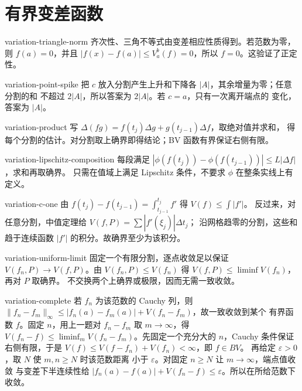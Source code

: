\chapter{有界变差函数}
\begin{solution}{variation-triangle-norm}
齐次性、三角不等式由变差相应性质得到。若范数为零，则 \(f(a)=0\)，并且
\(|f(x)-f(a)|\le V_a^b(f)=0\)，所以 \(f=0\)。这验证了正定性。
\end{solution}
\begin{solution}{variation-point-spike}
把 \(c\) 放入分割产生上升和下降各 \(|A|\)，其余增量为零；任意分割的和
不超过 \(2|A|\)，所以答案为 \(2|A|\)。若 \(c=a\)，只有一次离开端点的
变化，答案为 \(|A|\)。
\end{solution}
\begin{solution}{variation-product}
写 \(\Delta(fg)=f(t_j)\Delta g+g(t_{j-1})\Delta f\)，取绝对值并求和，
得每个分割的估计。对分割取上确界即得结论；BV 函数有界保证右侧有限。
\end{solution}
\begin{solution}{variation-lipschitz-composition}
每段满足 \(|\phi(f(t_j))-\phi(f(t_{j-1}))|\le L|\Delta f|\)，求和再取确界。
只需在值域上满足 Lipschitz 条件，不要求 \(\phi\) 在整条实线上有定义。
\end{solution}
\begin{solution}{variation-c-one}
由 \(f(t_j)-f(t_{j-1})=\int_{t_{j-1}}^{t_j}f'\) 得 \(V(f)\le\int|f'|\)。
反过来，对任意分割，中值定理给 \(V(f,P)=\sum|f'(\xi_j)|\Delta t_j\)；
沿网格趋零的分割，这些和趋于连续函数 \(|f'|\) 的积分。故确界至少为该积分。
\end{solution}
\begin{solution}{variation-uniform-limit}
固定一个有限分割，逐点收敛足以保证 \(V(f_n,P)\to V(f,P)\)。由
\(V(f_n,P)\le V(f_n)\) 得 \(V(f,P)\le\liminf V(f_n)\)，再对 \(P\) 取确界。
不交换两个上确界或极限，因而无需一致收敛。
\end{solution}
\begin{solution}{variation-complete}
若 \(f_n\) 为该范数的 Cauchy 列，则
\(\|f_n-f_m\|_\infty\le |f_n(a)-f_m(a)|+V(f_n-f_m)\)，故一致收敛到某个
有界函数 \(f\)。固定 \(n\)，用上一题对 \(f_n-f_m\) 取 \(m\to\infty\)，得
\(V(f_n-f)\le\liminf_mV(f_n-f_m)\)。先固定一个充分大的 \(n\)，Cauchy
条件保证右侧有限，于是 \(V(f)\le V(f-f_n)+V(f_n)<\infty\)，即 \(f\in BV\)。
再给定 \(\varepsilon>0\)，取 \(N\) 使 \(m,n\ge N\) 时该范数距离
小于 \(\varepsilon\)。对固定 \(n\ge N\) 让 \(m\to\infty\)，端点值收敛
与变差下半连续性给
\(|f_n(a)-f(a)|+V(f_n-f)\le\varepsilon\)。所以在所给范数下收敛。
\end{solution}
